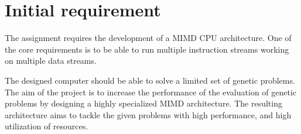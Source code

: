 \section {Initial requirement}
The assignment requires the development of a MIMD CPU architecture.
One of the core requirements is to be able to run multiple instruction streams working on multiple data streams.

The designed computer should be able to solve a limited set of genetic problems.
The aim of the project is to increase the performance of the evaluation of genetic problems by designing a highly specialized MIMD architecture.
The resulting architecture aims to tackle the given problems with high performance, and high utilization of resources.
